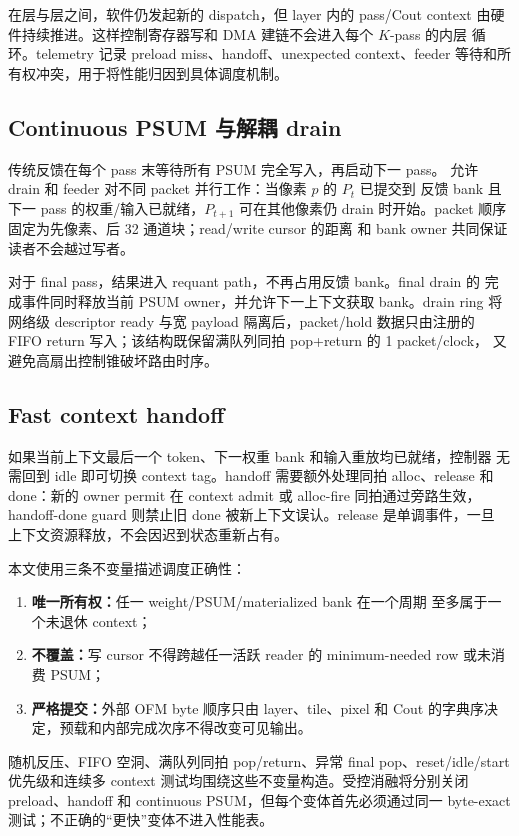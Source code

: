 在层与层之间，软件仍发起新的 dispatch，但 layer 内的 pass/Cout context
由硬件持续推进。这样控制寄存器写和 DMA 建链不会进入每个 $K$-pass 的内层
循环。telemetry 记录 preload miss、handoff、unexpected context、feeder
等待和所有权冲突，用于将性能归因到具体调度机制。

\subsection{Continuous PSUM 与解耦 drain}

传统反馈在每个 pass 末等待所有 PSUM 完全写入，再启动下一 pass。\LASA
允许 drain 和 feeder 对不同 packet 并行工作：当像素 $p$ 的 $P_t$ 已提交到
反馈 bank 且下一 pass 的权重/输入已就绪，$P_{t+1}$ 可在其他像素仍 drain
时开始。packet 顺序固定为先像素、后 32 通道块；read/write cursor 的距离
和 bank owner 共同保证读者不会越过写者。

对于 final pass，结果进入 requant path，不再占用反馈 bank。final drain 的
完成事件同时释放当前 PSUM owner，并允许下一上下文获取 bank。drain ring
将网络级 descriptor ready 与宽 payload 隔离后，packet/hold 数据只由注册的
FIFO return 写入；该结构既保留满队列同拍 pop+return 的 1 packet/clock，
又避免高扇出控制锥破坏路由时序。

\subsection{Fast context handoff}

如果当前上下文最后一个 token、下一权重 bank 和输入重放均已就绪，控制器
无需回到 idle 即可切换 context tag。handoff 需要额外处理同拍 alloc、release
和 done：新的 owner permit 在 context admit 或 alloc-fire 同拍通过旁路生效，
handoff-done guard 则禁止旧 done 被新上下文误认。release 是单调事件，一旦
上下文资源释放，不会因迟到状态重新占有。

本文使用三条不变量描述调度正确性：
\begin{enumerate}[leftmargin=2em]
  \item \textbf{唯一所有权：}任一 weight/PSUM/materialized bank 在一个周期
  至多属于一个未退休 context；
  \item \textbf{不覆盖：}写 cursor 不得跨越任一活跃 reader 的 minimum-needed
  row 或未消费 PSUM；
  \item \textbf{严格提交：}外部 OFM byte 顺序只由 layer、tile、pixel 和 Cout
  的字典序决定，预载和内部完成次序不得改变可见输出。
\end{enumerate}
随机反压、FIFO 空洞、满队列同拍 pop/return、异常 final pop、reset/idle/start
优先级和连续多 context 测试均围绕这些不变量构造。受控消融将分别关闭
preload、handoff 和 continuous PSUM，但每个变体首先必须通过同一 byte-exact
测试；不正确的“更快”变体不进入性能表。

